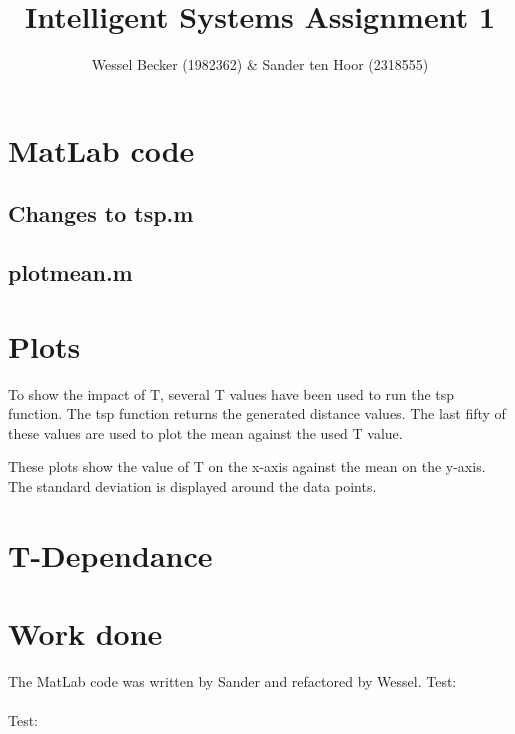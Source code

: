 \documentclass[10pt,a4paper]{article}
\begin{document}
\title{Intelligent Systems Assignment 1}
\author{Wessel Becker (1982362) \& Sander ten Hoor (2318555)}
\maketitle
\section{MatLab code}
\subsection{Changes to tsp.m}
\subsection{plotmean.m}


\section{Plots}
To show the impact of T, several T values have been used to run the tsp function. The tsp function returns the generated distance values. The last fifty of these values are used to plot the mean against the used T value.


These plots show the value of T on the x-axis against the mean on the y-axis. The standard deviation is displayed around the data points.


\section{T-Dependance}
\section{Work done}
The MatLab code was written by Sander and refactored by Wessel. 
Test: \\\\


Test: \\\\

\end{document}

